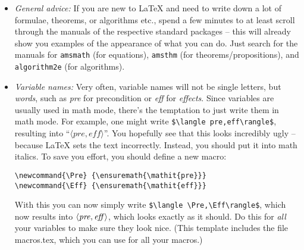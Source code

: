 \begin{itemize}
\begin{itemize}
    \item \emph{General advice:} If you are new to \LaTeX{} and need to write down a lot of formulae, theorems, or algorithms etc., spend a few minutes to at least scroll through the manuals of the respective standard packages -- this will already show you examples of the appearance of what you can do. Just search for the manuals for \verb!amsmath! (for equations), \verb!amsthm! (for theorems/propositions), and \verb!algorithm2e! (for algorithms).
    
    \item \emph{Variable names:} Very often, variable names will not be single letters, but \emph{words}, such as \emph{pre} for precondition or \emph{eff} for \emph{effects}. Since variables are usually used in math mode, there's the temptation to just write them in math mode. For example, one might write \verb!$\langle pre,eff\rangle$!, resulting into ``$\langle pre,eff\rangle$''. You hopefully see that this looks incredibly ugly -- because \LaTeX{} sets the text incorrectly. Instead, you should put it into math italics. To save you effort, you should define a new macro:
    \begin{center}
      \verb!\newcommand{\Pre} {\ensuremath{\mathit{pre}}}!\\
      \verb!\newcommand{\Eff} {\ensuremath{\mathit{eff}}}!
    \end{center}

    With this you can now simply write \verb!$\langle \Pre,\Eff\rangle$!, which now results into $\langle \Pre,\Eff\rangle$, which looks exactly as it should. Do this for \emph{all} your variables to make sure they look nice. (This template includes the file macros.tex, which you can use for all your macros.)
  \end{itemize}

  
  
  

\end{itemize}
